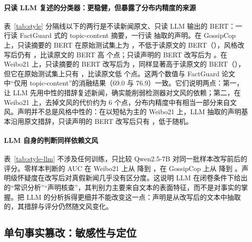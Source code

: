 \paragraph{只读 LLM 复述的分类器：更稳健，但暴露了分布内精度的来源}
表~\ref{tab:style} 分隔线以下的两行是不读新闻原文、只读 LLM 输出的 BERT：一行读 FactGuard 式的 topic-content 摘要，一行读 \method{} 抽取的声明。在 GossipCop 上，只读摘要的 BERT 在原始测试集上为 ，不低于读原文的 BERT（），风格改写后仍有 ，比读原文的 BERT 高  个点；只读声明的 BERT 改写后为 。在 Weibo21 上，只读摘要的 BERT 改写后为 ，同样显著高于读原文的 BERT（），但它在原始测试集上只有 ，比读原文低  个点。这两个数值与 FactGuard 论文中“仅用 topic-content”的消融结果（69.0 与 76.9）\citep{he2026factguard}一致。它们说明两点：第一，让 LLM 先用中性的措辞复述新闻，确实能削弱检测器对文风的依赖；第二，在 Weibo21 上，去掉文风的代价约为 6 个点，分布内精度中有相当一部分来自文风。声明并不总是风格中性的：在以短帖为主的 Weibo21 上，LLM 抽取的声明基本沿用原文措辞，只读声明的 BERT 改写后只有 ，低于随机。

\paragraph{LLM 自身的判断同样依赖文风}
表~\ref{tab:style-llm} 不涉及任何训练，只比较 Qwen2.5-7B 对同一批样本改写前后的评分。零样本判断的 AUC 在 Weibo21 上从  降到 ，在 GossipCop 上从  降到 。声明级怀疑度在改写后对真假新闻几乎没有区分度。这说明 LLM 在闭卷条件下给出的“常识分析”“声明核查”，其判别力主要来自文本的表面特征，而不是对事实的掌握。把 LLM 的分析拆得更细并不能改变这一点：声明是从改写后的文本中抽取的，其措辞与评分仍然随文风变化。

\begin{table}[!htbp]
\centering\small
\caption{Qwen2.5-7B 的评分在风格改写前后对真假新闻的区分能力（不涉及训练）。均值差为假新闻与真新闻平均评分之差。}\label{tab:style-llm}
\end{table}

\subsection{单句事实篡改：敏感性与定位}\label{sec:exp-loc}

